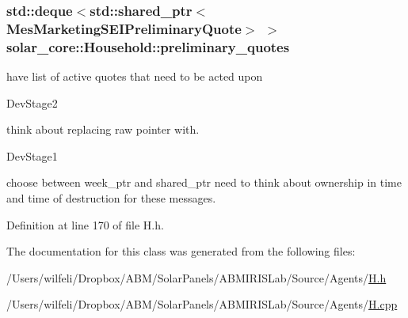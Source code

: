 \subsubsection[{preliminary\+\_\+quotes}]{\setlength{\rightskip}{0pt plus 5cm}std\+::deque$<$std\+::shared\+\_\+ptr$<${\bf Mes\+Marketing\+S\+E\+I\+Preliminary\+Quote}$>$ $>$ solar\+\_\+core\+::\+Household\+::preliminary\+\_\+quotes\hspace{0.3cm}{\ttfamily [protected]}}\label{classsolar__core_1_1_household_a297842358a2d79db160566106972bc0d}
have list of active quotes that need to be acted upon\begin{DoxyRefDesc}{Dev\+Stage2}
\item[\hyperlink{_dev_stage2__DevStage2000006}{Dev\+Stage2}]think about replacing raw pointer with.\end{DoxyRefDesc}
\begin{DoxyRefDesc}{Dev\+Stage1}
\item[\hyperlink{_dev_stage1__DevStage1000004}{Dev\+Stage1}]choose between week\+\_\+ptr and shared\+\_\+ptr need to think about ownership in time and time of destruction for these messages. \end{DoxyRefDesc}


Definition at line 170 of file H.\+h.



The documentation for this class was generated from the following files\+:\begin{DoxyCompactItemize}
\item 
/\+Users/wilfeli/\+Dropbox/\+A\+B\+M/\+Solar\+Panels/\+A\+B\+M\+I\+R\+I\+S\+Lab/\+Source/\+Agents/\hyperlink{_h_8h}{H.\+h}\item 
/\+Users/wilfeli/\+Dropbox/\+A\+B\+M/\+Solar\+Panels/\+A\+B\+M\+I\+R\+I\+S\+Lab/\+Source/\+Agents/\hyperlink{_h_8cpp}{H.\+cpp}\end{DoxyCompactItemize}
